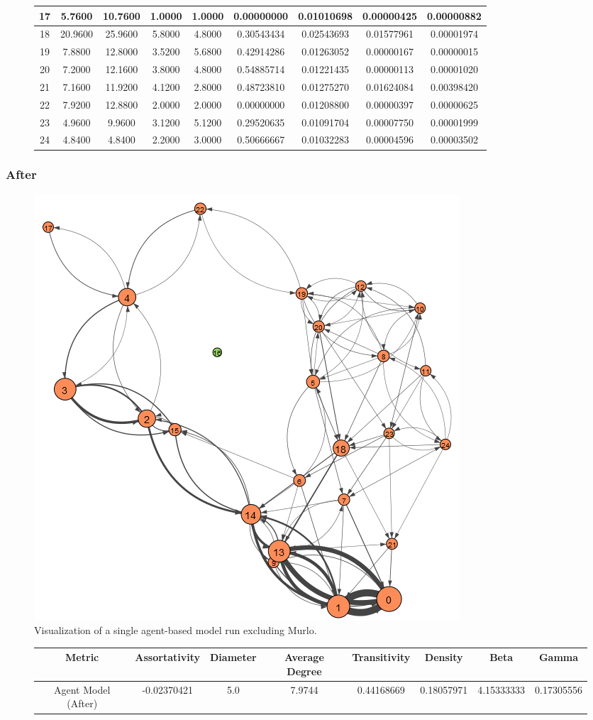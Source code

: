\documentclass[12pt,a4paper]{thesis}
\begin{document}
\begin{figure}[H]
\begin{tabular}{|c|c|c|c|c|c|c|c|c|}
\hline	17	&	5.7600	&	10.7600	&	1.0000	&	1.0000	&	0.00000000	&	0.01010698	&	0.00000425	&	0.00000882	\\
\hline	18	&	20.9600	&	25.9600	&	5.8000	&	4.8000	&	0.30543434	&	0.02543693	&	0.01577961	&	0.00001974	\\
\hline	19	&	7.8800	&	12.8000	&	3.5200	&	5.6800	&	0.42914286	&	0.01263052	&	0.00000167	&	0.00000015	\\
\hline	20	&	7.2000	&	12.1600	&	3.8000	&	4.8000	&	0.54885714	&	0.01221435	&	0.00000113	&	0.00001020	\\
\hline	21	&	7.1600	&	11.9200	&	4.1200	&	2.8000	&	0.48723810	&	0.01275270	&	0.01624084	&	0.00398420	\\
\hline	22	&	7.9200	&	12.8800	&	2.0000	&	2.0000	&	0.00000000	&	0.01208800	&	0.00000397	&	0.00000625	\\
\hline	23	&	4.9600	&	9.9600	&	3.1200	&	5.1200	&	0.29520635	&	0.01091704	&	0.00007750	&	0.00001999	\\
\hline	24	&	4.8400	&	4.8400	&	2.2000	&	3.0000	&	0.50666667	&	0.01032283	&	0.00004596	&	0.00003502	\\
\hline 
\end{tabular} 
\end{figure}

\subsubsection{After}

\begin{figure}[H]
\centering
\includegraphics[width=0.35\linewidth]{./AfterViz/agent}
\caption{Visualization of a single agent-based model run excluding Murlo.}
\label{fig:agentAfter}
\end{figure}

\begin{figure}[H]
\centering
\tiny
\begin{tabular}{|c|c|c|c|c|c|c|c|}
\hline Metric & Assortativity & Diameter & Average Degree & Transitivity & Density & Beta & Gamma \\ 
\hline Agent Model (After) & -0.02370421 & 5.0 & 7.9744 & 0.44168669 & 0.18057971 & 4.15333333 & 0.17305556 \\ 
\hline 
\end{tabular} 
\end{figure}
\end{document}

